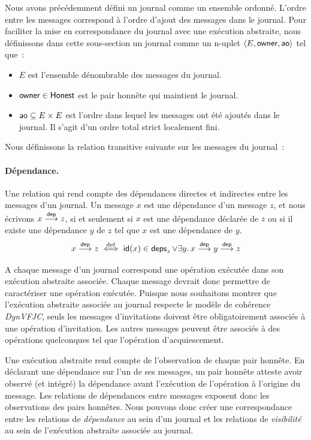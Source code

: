 Nous avons précédemment défini un journal comme un ensemble ordonné.
L'ordre entre les messages correspond à l'ordre d'ajout des messages dans le journal.
Pour faciliter la mise en correspondance du journal avec une exécution abstraite, nous définissons dans cette sous-section un journal comme un n-uplet $\tuple*{E, \trm{owner}, \trm{ao}}$ tel que~:
\begin{itemize}
    \item $E$ est l'ensemble dénombrable des messages du journal.
    \item $\trm{owner} \in \trm{Honest}$ est le pair honnête qui maintient le journal.
    \item $\trm{ao} \subseteq E \times E$ est l'ordre dans lequel les messages ont été ajoutés dans le journal.
    Il s'agit d'un ordre total strict localement fini.
\end{itemize}

Nous définissons la relation transitive suivante sur les messages du journal~:

\paragraph{Dépendance.} Une relation qui rend compte des dépendances directes et indirectes entre les messages d'un journal.
Un message $x$ est une dépendance d'un message $z$, et nous écrivons $x \dep z$, si et seulement si $x$ est une dépendance déclarée de $z$ ou si il existe une dépendance $y$ de $z$ tel que $x$ est une dépendance de $y$.
\begin{equation*}
    x \dep z \defiff \trm{id}(x) \in \trm{deps}_z \lor \exists y \qsep x \dep y \dep z
\end{equation*}

A chaque message d'un journal correspond une opération exécutée dans son exécution abstraite associée.
Chaque message devrait donc permettre de caractériser une opération exécutée.
Puisque nous souhaitons montrer que l'exécution abstraite associée au journal respecte le modèle de cohérence \emph{DynVFJC}, seuls les messages d'invitations doivent être obligatoirement associés à une opération d'invitation.
Les autres messages peuvent être associés à des opérations quelconques tel que l'opération d'acquiescement.

Une exécution abstraite rend compte de l'observation de chaque pair honnête.
En déclarant une dépendance sur l'un de ses messages, un pair honnête atteste avoir observé (et intégré) la dépendance avant l'exécution de l'opération à l'origine du message.
Les relations de dépendances entre messages exposent donc les observations des pairs honnêtes.
Nous pouvons donc créer une correspondance entre les relations de \emph{dépendance} au sein d'un journal et les relations de \emph{visibilité} au sein de l'exécution abstraite associée au journal.

